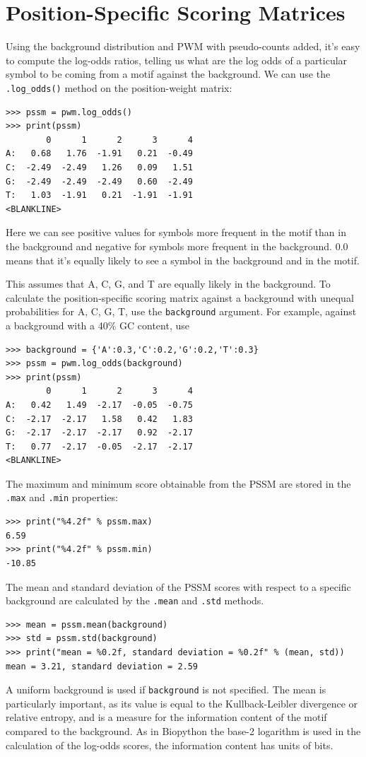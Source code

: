 \documentclass{report}
\begin{document}
\section{Position-Specific Scoring Matrices}

Using the background distribution and PWM with pseudo-counts added,
it's easy to compute the log-odds ratios, telling us what are the log
odds of a particular symbol to be coming from a motif against the
background. We can use the \verb|.log_odds()| method on the position-weight
matrix:
\begin{verbatim}
>>> pssm = pwm.log_odds()
>>> print(pssm)
        0      1      2      3      4
A:   0.68   1.76  -1.91   0.21  -0.49
C:  -2.49  -2.49   1.26   0.09   1.51
G:  -2.49  -2.49  -2.49   0.60  -2.49
T:   1.03  -1.91   0.21  -1.91  -1.91
<BLANKLINE>
\end{verbatim}
Here we can see positive values for symbols more frequent in the motif
than in the background and negative for symbols more frequent in the
background. $0.0$ means that it's equally likely to see a symbol in the
background and in the motif.

This assumes that A, C, G, and T are equally likely in the background. To
calculate the position-specific scoring matrix against a background with
unequal probabilities for A, C, G, T, use the \verb+background+ argument.
For example, against a background with a 40\% GC content, use
\begin{verbatim}
>>> background = {'A':0.3,'C':0.2,'G':0.2,'T':0.3}
>>> pssm = pwm.log_odds(background)
>>> print(pssm)
        0      1      2      3      4
A:   0.42   1.49  -2.17  -0.05  -0.75
C:  -2.17  -2.17   1.58   0.42   1.83
G:  -2.17  -2.17  -2.17   0.92  -2.17
T:   0.77  -2.17  -0.05  -2.17  -2.17
<BLANKLINE>
\end{verbatim}

The maximum and minimum score obtainable from the PSSM are stored in the
\verb+.max+ and \verb+.min+ properties:
\begin{verbatim}
>>> print("%4.2f" % pssm.max)
6.59
>>> print("%4.2f" % pssm.min)
-10.85
\end{verbatim}

The mean and standard deviation of the PSSM scores with respect to a specific
background are calculated by the \verb+.mean+ and \verb+.std+ methods.
\begin{verbatim}
>>> mean = pssm.mean(background)
>>> std = pssm.std(background)
>>> print("mean = %0.2f, standard deviation = %0.2f" % (mean, std))
mean = 3.21, standard deviation = 2.59
\end{verbatim}
A uniform background is used if \verb+background+ is not specified.
The mean is particularly important, as its value is equal to the 
Kullback-Leibler divergence or relative entropy, and is a measure for the
information content of the motif compared to the background. As in Biopython
the base-2 logarithm is used in the calculation of the log-odds scores, the
information content has units of bits.
\end{document}

